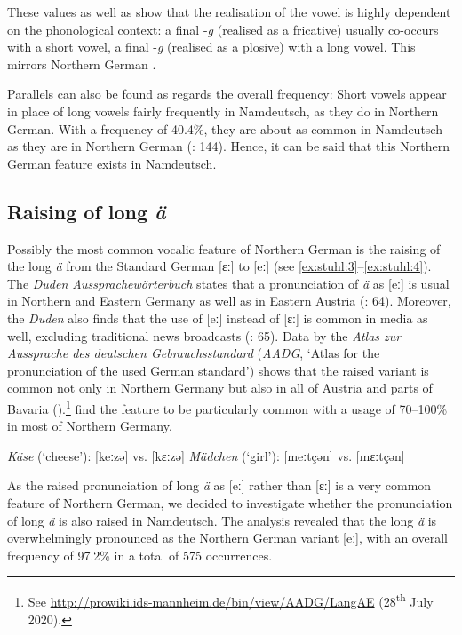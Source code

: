 \documentclass[output=paper]{langsci/langscibook}
\begin{document}
These values as well as  show that the realisation of the vowel is highly dependent on the phonological context: a final -\textit{g} (realised as a fricative) usually co-occurs with a short vowel, a final -\textit{g} (realised as a plosive) with a long vowel. This mirrors Northern German \citep[77]{elmentaler_varietatendynamik_2008}.

Parallels can also be found as regards the overall frequency: Short vowels appear in place of long vowels fairly frequently in Namdeutsch, as they do in Northern German. With a frequency of 40.4\%, they are about as common in Namdeutsch as they are in Northern German (\citealt{elmentaler_norddeutscher_2015}: 144). Hence, it can be said that this Northern German feature exists in Namdeutsch.

\subsection{Raising of long \textit{ä}}
\label{sec:stuhl:4.2}

Possibly the most common vocalic feature of Northern German is the raising of the long \textit{ä} from the Standard German [ɛː] to [eː] (see \ref{ex:stuhl:3}--\ref{ex:stuhl:4}). The \textit{Duden Aussprachewörterbuch} states that a pronunciation of \textit{ä} as [eː] is usual in Northern and Eastern Germany as well as in Eastern Austria (\citealt{kleiner_duden_2015}: 64). Moreover, the \textit{Duden} also finds that the use of [eː] instead of [ɛː] is common in media as well, excluding traditional news broadcasts (\citealt{kleiner_duden_2015}: 65). Data by the \textit{Atlas zur Aussprache des deutschen Gebrauchsstandard} (\textit{AADG}, ‘Atlas for the pronunciation of the used German standard’) shows that the raised variant is common not only in Northern Germany but also in all of Austria and parts of Bavaria (\citealt{kleiner_atlas_2011}).\footnote{See \url{http://prowiki.ids-mannheim.de/bin/view/AADG/LangAE} (28\textsuperscript{th} July 2020).} \citet[104]{elmentaler_norddeutscher_2015} find the feature to be particularly common with a usage of 70--100\% in most of Northern Germany. 

 

\ea 
\label{ex:stuhl:3}
{\textit{Käse}} (‘cheese’): {[keːzə]} vs. {[kɛːzə]} 
\ex
\label{ex:stuhl:4}
{\textit{Mädchen}} (‘girl’): {[meːtçən]} vs. {[}mɛːtçən{]}
 \z

As the raised pronunciation of long \textit{ä} as [eː] rather than [ɛː] is a very common feature of Northern German, we decided to investigate whether the pronunciation of long \textit{ä} is also raised in Namdeutsch. The analysis revealed that the long \textit{ä} is overwhelmingly pronounced as the Northern German variant [eː], with an overall frequency of 97.2\% in a total of 575 occurrences.
\end{document}
